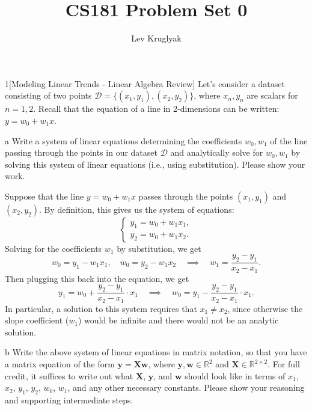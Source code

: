 \documentclass[expanded]{pset}
\title{CS181 Problem Set 0}
\author{Lev Kruglyak}
\begin{document}
\maketitle

\begin{problem}{1}[Modeling Linear Trends - Linear Algebra Review]
Let's consider a dataset consisting of two points $\mathcal{D} = \{(x_1, y_1), (x_2, y_2)\}$, where $x_n, y_n$ are scalars for $n=1, 2$. Recall that the equation of a line in 2-dimensions can be written: $y = w_0 + w_1x$. 
\end{problem}

\begin{parts}
  \begin{part}{a}
    Write a system of linear equations determining the coefficients $w_0, w_1$ of the line passing through the points in our dataset $\mathcal{D}$ and analytically solve for $w_0, w_1$ by solving this system of linear equations (i.e., using substitution). Please show your work.
  \end{part}

  Suppose that the line $y= w_0 + w_1x$ passes through the points $(x_1, y_1)$ and $(x_2, y_2)$. By definition, this gives us the system of equations:
  \[
    \begin{cases}
      y_1 = w_0 + w_1 x_1,\\ y_2 = w_0 + w_1 x_2.
    \end{cases}
  \]
  Solving for the coefficients $w_1$ by substitution, we get
  \[
    w_0 = y_1 - w_1x_1, \quad w_0 = y_2 - w_1 x_2 \quad\implies\quad w_1 = \frac{y_2 - y_1}{x_2 - x_1}.
  \]
  Then plugging this back into the equation, we get
  \[
    y_1 = w_0 + \frac{y_2-y_1}{x_2 - x_1}\cdot x_1 \quad\implies\quad w_0 = y_1 - \frac{y_2 - y_1}{x_2 - x_1}\cdot x_1.
  \]
  In particular, a solution to this system requires that $x_1\neq x_2$, since otherwise the slope coefficient ($w_1$) would be infinite and there would not be an analytic solution.

  \begin{part}{b}
    Write the above system of linear equations in matrix notation, so that you have a matrix equation of the form $\mathbf{y} = \mathbf{X}\mathbf{w}$, where $\mathbf{y}, \mathbf{w} \in \mathbb{R}^2$ and $\mathbf{X} \in \mathbb{R}^{2\times 2}$. 
    For full credit, it suffices to write out what $\mathbf{X}$, $\mathbf{y}$, and $\mathbf{w}$ should look like in terms of $x_1$, $x_2$, $y_1$, $y_2$, $w_0$, $w_1$, and any other necessary constants. Please show your reasoning and supporting intermediate steps.
  \end{part}


\end{parts}
\end{document}
